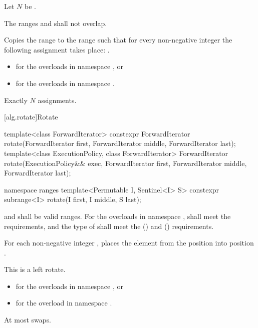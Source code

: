 \begin{itemdescr}
\pnum
Let $N$ be .

\pnum
\requires
The ranges  and 
shall not overlap.

\pnum
\effects
Copies the range  to the range 
such that for every non-negative integer 
the following assignment takes place:
.

\pnum
\returns
\begin{itemize}
\item
   for the overloads in namespace , or
\item
   for the overloads in namespace .
\end{itemize}

\pnum
\complexity
Exactly $N$ assignments.
\end{itemdescr}

[alg.rotate]{Rotate}

%
\begin{itemdecl}
template<class ForwardIterator>
  constexpr ForwardIterator
    rotate(ForwardIterator first, ForwardIterator middle, ForwardIterator last);
template<class ExecutionPolicy, class ForwardIterator>
  ForwardIterator
    rotate(ExecutionPolicy&& exec,
           ForwardIterator first, ForwardIterator middle, ForwardIterator last);

namespace ranges {
  template<Permutable I, Sentinel<I> S>
    constexpr subrange<I> rotate(I first, I middle, S last);
}
\end{itemdecl}

\begin{itemdescr}
\pnum
\requires
{} and  shall be valid ranges.
For the overloads in namespace ,
 shall meet
the  requirements, and
the type of  shall meet
the  () and
 () requirements.

\pnum
\effects
For each non-negative integer ,
places the element from the position 
into position .
\begin{note}
This is a left rotate.
\end{note}

\pnum
\returns
\begin{itemize}
\item
  for the overloads in namespace , or
\item
  for the overload in namespace .
\end{itemize}

\pnum
\complexity
At most  swaps.
\end{itemdescr}

